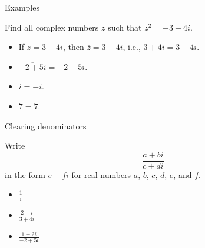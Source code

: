 \documentclass{beamer}
\begin{document}
\begin{frame}{Examples}
\begin{example}
Find all complex numbers $z$ such that $z^2 = -3+4i$.
\end{example}
\begin{example}
\begin{itemize}
\item If $z=3+4i$, then $\overline{z}= 3-4i$,
i.e., $\overline{3+4i}=3-4i$.
\item $\overline{-2+5i}= -2-5i$.
\item $\overline{i}= -i$.
\item $\overline{7}= 7$.
\end{itemize}
\end{example}
\end{frame}

\begin{frame}{Clearing denominators}
\begin{example}[Exemplar]
Write 
\begin{equation*}
\frac{a+bi}{c+di}
\end{equation*}
in the form $e+fi$ for real numbers $a$, $b$, $c$, $d$, $e$, and $f$.
\end{example}
\begin{itemize}
\item $\frac{1}{i}$ %
\item $\frac{2-i}{3+4i}$ %
\item $\frac{1-2i}{-2+5i}$ %
\end{itemize}
\end{frame}
\end{document}
